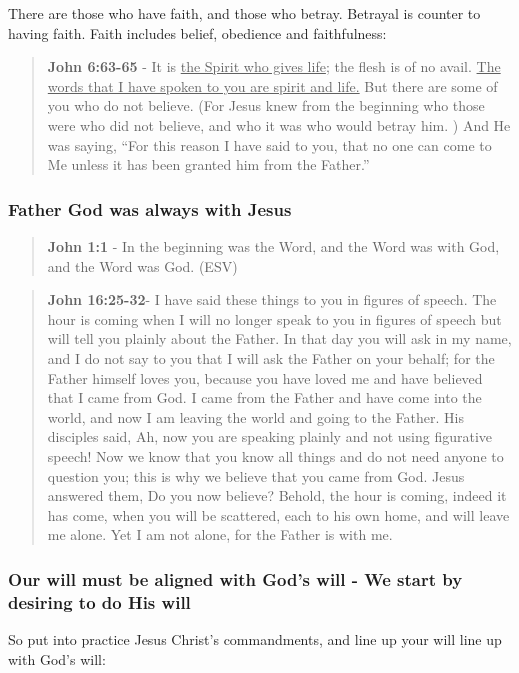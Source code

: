 \documentclass[11pt]{article}
\begin{document}
There are those who have faith, and those who betray. Betrayal is counter to having faith. Faith includes belief, obedience and faithfulness:

\begin{quote}
\textbf{John 6:63-65} - It is \uline{the Spirit who gives life}; the flesh is of no avail. \uline{The words that I have spoken to you are spirit and life.} But there are some of you who do not believe. (For Jesus knew from the beginning who those were who did not believe, and who it was who would betray him. ) And He was saying, “For this reason I have said to you, that no one can come to Me unless it has been granted him from the Father.”
\end{quote}

\subsubsection{Father God was always with Jesus}
\label{sec:org9d5a303}
\begin{quote}
\textbf{John 1:1} - In the beginning was the Word, and the Word was with God, and the Word was God. (ESV)
\end{quote}

\begin{quote}
\textbf{John 16:25-32}- I have said these things to you in figures of speech. The hour is coming when I will no longer speak to you in figures of speech but will tell you plainly about the Father. In that day you will ask in my name, and I do not say to you that I will ask the Father on your behalf; for the Father himself loves you, because you have loved me and have believed that I came from God. I came from the Father and have come into the world, and now I am leaving the world and going to the Father. His disciples said, Ah, now you are speaking plainly and not using figurative speech! Now we know that you know all things and do not need anyone to question you; this is why we believe that you came from God. Jesus answered them, Do you now believe? Behold, the hour is coming, indeed it has come, when you will be scattered, each to his own home, and will leave me alone. Yet I am not alone, for the Father is with me.
\end{quote}

\subsubsection{Our will must be aligned with God's will - We start by desiring to do His will}
\label{sec:org298e56b}
So put into practice Jesus Christ's commandments, and line up your will line up with God's will:
\end{document}
